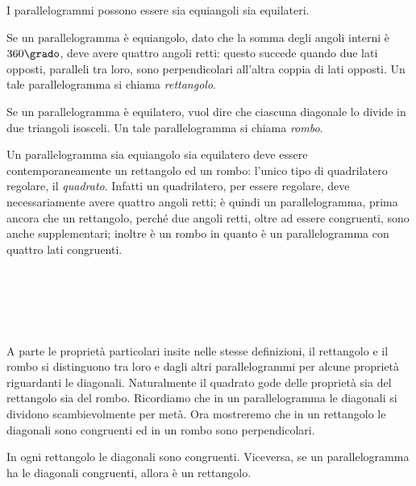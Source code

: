 I parallelogrammi possono essere sia equiangoli sia equilateri.

\noindent\begin{minipage}{0.7\textwidth}\parindent15pt
  Se un parallelogramma è equiangolo, dato che la somma degli angoli 
  interni è \(360\grado\), deve avere quattro angoli retti: questo 
  succede quando due lati opposti, paralleli tra loro, sono 
  perpendicolari all’altra coppia di lati opposti. Un tale 
  parallelogramma si chiama \emph{rettangolo}.
  
  Se un parallelogramma è equilatero, vuol dire che ciascuna diagonale 
  lo divide in due triangoli isosceli. Un tale parallelogramma si 
  chiama \emph{rombo}.
  
  Un parallelogramma sia equiangolo sia equilatero deve essere 
  contemporaneamente un rettangolo ed un rombo: l'unico tipo di 
  quadrilatero regolare, il \emph{quadrato}. Infatti un quadrilatero, 
  per essere regolare, deve necessariamente avere quattro angoli retti; 
  è quindi un parallelogramma, prima ancora che un rettangolo, perché 
  due angoli retti, oltre ad essere congruenti, sono anche 
  supplementari; inoltre è un rombo in quanto è un parallelogramma con 
  quattro lati congruenti.
\end{minipage}\hfil
\begin{minipage}{0.3\textwidth}
  \centering\\~\\
  \centering\\~\\
  \centering
\end{minipage}

A parte le proprietà particolari insite nelle stesse definizioni, il 
rettangolo e il rombo si distinguono tra loro e dagli altri 
parallelogrammi per alcune proprietà riguardanti le diagonali. 
Naturalmente il quadrato gode delle proprietà sia del rettangolo sia 
del rombo.
Ricordiamo che in un parallelogramma le diagonali si dividono 
scambievolmente per metà. Ora mostreremo che in un rettangolo le 
diagonali sono congruenti ed in un rombo sono perpendicolari.

\begin{teorema}
  In ogni rettangolo le diagonali sono congruenti. Viceversa, se un 
  parallelogramma ha le diagonali congruenti, allora è un rettangolo.
\end{teorema}



